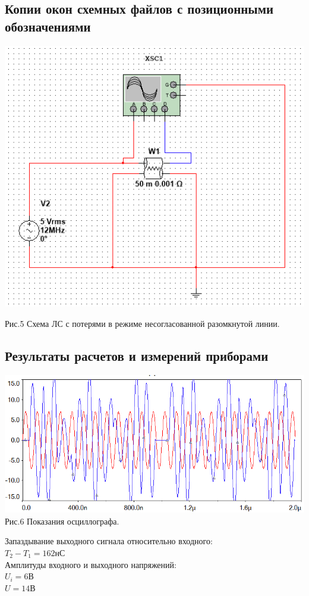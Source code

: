 \documentclass[11pt]{article}
\begin{document}
\subsection{Копии окон схемных файлов с позиционными обозначениями}
\includegraphics[width=1\linewidth]{img/second.png}
\begin{center}
    Рис.5 Схема ЛС с потерями в режиме несогласованной разомкнутой линии.
\end{center}

\subsection{Результаты расчетов и измерений приборами}
\begin{center}
    \includegraphics[width=1\linewidth]{img/second1.png}
        Рис.6 Показания осциллографа.
\end{center}
    Запаздывание выходного сигнала относительно входного:\\
    $T_2 - T_1 = 162$нС\\
    Амплитуды входного и выходного напряжений:\\
    $U_i = 6$В\\
    $U = 14$В    
\newpage
\end{document}
